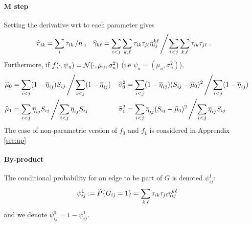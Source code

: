 \paragraph{M step}
Setting the derivative wrt to each parameter gives
\begin{align*}
 \widehat{\pi}_{ik} & = \sum_{i} \tau_{ik} \left/ n \right.,  
 & \widehat{\gamma}_{k\ell} & = \sum_{i < j} \sum_{k, \ell} \tau_{ik} \tau_{j\ell} \eta^{k\ell}_{ij} \left/ \sum_{i < j} \sum_{k, \ell} \tau_{ik} \tau_{j\ell} \right..
\end{align*}
Furthermore, if $f(\cdot, \psi_u) = \mathcal{N}(\cdot, \mu_u, \sigma_u^2)$ (i.e $\psi_u = (\mu_u, \sigma_u^2)$), 
\begin{align*}
 \widehat{\mu}_0 & = \sum_{i < j} (1 - \overline{\eta}_{ij}) S_{ij} \left/ \sum_{i < j} (1 - \overline{\eta}_{ij}) \right. 
 & \widehat{\sigma}_0^2 & = \sum_{i < j} (1 - \overline{\eta}_{ij}) (S_{ij} - \widehat{\mu}_0)^2 \left/ \sum_{i < j} (1 - \overline{\eta}_{ij}) \right. \\ 
 \widehat{\mu}_1 & = \sum_{i < j} \overline{\eta}_{ij} S_{ij} \left/ \sum_{i < j} \overline{\eta}_{ij} S_{ij} \right. 
 & \widehat{\sigma}_1^2 & = \sum_{i < j} \overline{\eta}_{ij} (S_{ij} - \widehat{\mu}_0)^2 \left/ \sum_{i < j} \overline{\eta}_{ij} S_{ij} \right. \\ 
\end{align*}
The case of non-parametric version of $f_0$ and $f_1$ is considered in Apprendix \ref{sec:np}

\paragraph{By-product}
The conditional probability for an edge to be part of $G$ is denoted $\psi_{ij}^1$:
$$
\psi_{ij}^1 := \widetilde{P}\{G_{ij} = 1\} = \sum_{k, \ell} \tau_{ik} \tau_{j\ell} \eta^{k\ell}_{ij} 
$$
and we denote $\psi_{ij}^0 = 1 - \psi_{ij}^1$.

